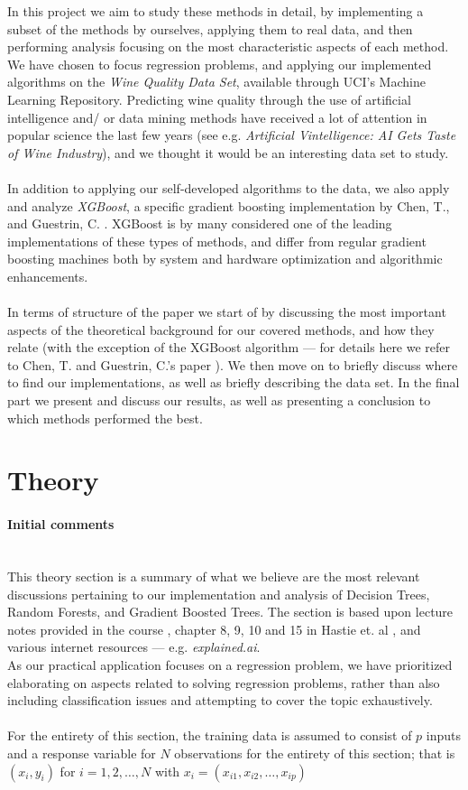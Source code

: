 \documentclass[10pt, a4paper, twocolumn]{article}
\newcommand{\myparagraph}[1]{\paragraph{#1}\mbox{}\\}
\begin{document}
	In this project we aim to study these methods in detail, by implementing a subset of the methods by ourselves, applying them to real data, and then performing analysis focusing on the most characteristic aspects of each method. We have chosen to focus regression problems, and applying our implemented algorithms on the \emph{Wine Quality Data Set}, available through UCI's Machine Learning Repository\cite{dataset}. Predicting wine quality through the use of artificial intelligence and/ or data mining methods have received a lot of attention in popular science the last few years (see e.g. \emph{Artificial Vintelligence: AI Gets Taste of Wine Industry}\cite{vintelligence}), and we thought it would be an interesting data set to study.\\\\
	In addition to applying our self-developed algorithms to the data, we also apply and analyze \emph{XGBoost}, a specific gradient boosting implementation by Chen, T., and Guestrin, C. \cite{XGBoost}. XGBoost is by many considered one of the leading implementations of these types of methods, and differ from regular gradient boosting machines both by system and hardware optimization and algorithmic enhancements.\\\\
	In terms of structure of the paper we start of by discussing the most important aspects of the theoretical background for our covered methods, and how they relate (with the exception of the XGBoost algorithm --- for details here we refer to Chen, T. and Guestrin, C.'s paper \cite{XGBoost}). We then move on to briefly discuss where to find our implementations, as well as briefly describing the data set. In the final part we present and discuss our results, as well as presenting a conclusion to which methods performed the best.
	
\section{Theory}
	\myparagraph{Initial comments}
		This theory section is a summary of what we believe are the most relevant discussions pertaining to our implementation and analysis of Decision Trees, Random Forests, and Gradient Boosted Trees. The section is based upon lecture notes provided in the course \cite{LectDT}, chapter 8, 9, 10 and 15 in Hastie et. al \cite{ElementsOfStatLearning}, and various internet resources --- e.g. \emph{explained.ai}\cite{explAIgbm}.\\
		As our practical application focuses on a regression problem, we have prioritized elaborating on aspects related to solving regression problems, rather than also including classification issues and attempting to cover the topic exhaustively.\\\\		
		For the entirety of this section, the training data is assumed to consist of $p$ inputs and a response variable for $N$ observations for the entirety of this section; that is $(x_i, y_i)$ for $i=1,2,\dots,N$ with $x_i=(x_{i1},x_{i2},\dots,x_{ip})$
\end{document}
